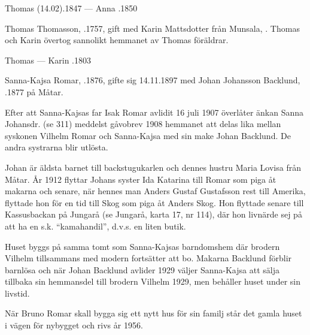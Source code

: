 Thomas (14.02).1847  ---  Anna .1850


Thomas Thomasson, .1757, gift med Karin Mattsdotter från Munsala, . Thomas och Karin övertog sannolikt hemmanet av Thomas föräldrar.
\begin{jhchildren}
  \item {}
  \item {}
\end{jhchildren}

Thomas   ---  Karin .1803






Sanna-Kajsa Romar, .1876, gifte sig 14.11.1897 med Johan Johansson Backlund, .1877 på Måtar.

Efter att Sanna-Kajsas far Isak Romar avlidit 16 juli 1907 överlåter änkan Sanna Johansdr. (se 311) meddelst gåvobrev 1908 hemmanet att delas lika mellan syskonen Vilhelm Romar och Sanna-Kajsa med sin make Johan Backlund. De andra systrarna blir utlösta.

Johan är äldsta barnet till backstugukarlen  och dennes hustru Maria Lovisa från Måtar. År 1912 flyttar Johans syster Ida Katarina till Romar som piga åt makarna och senare, när hennes man Anders Gustaf Gustafsson rest till Amerika, flyttade hon för en tid till Skog som piga åt Anders Skog. Hon flyttade senare till Kassusbackan på Jungarå (se Jungarå, karta 17, nr 114), där hon livnärde sej på att ha en s.k. ``kamahandil'', d.v.s. en liten butik.

Huset byggs på samma tomt som Sanna-Kajsas barndomshem där brodern Vilhelm tillsammans med modern fortsätter att bo. Makarna Backlund förblir barnlösa och när Johan Backlund avlider 1929 väljer Sanna-Kajsa att sälja tillbaka sin hemmansdel till brodern Vilhelm 1929, men behåller huset under sin livstid.

När Bruno Romar skall bygga sig ett nytt hus för sin familj står det gamla huset i vägen för nybygget och rivs år 1956.




